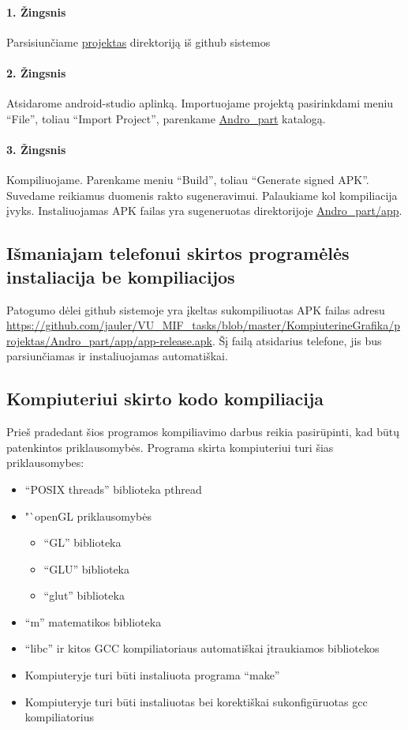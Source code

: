 \documentclass[12pt, a4paper, lithuanian, final]{article}
\begin{document}
\paragraph{1. Žingsnis}
Parsisiunčiame \url{projektas} direktoriją iš github sistemos

\paragraph{2. Žingsnis}
Atsidarome android-studio aplinką.
Importuojame projektą pasirinkdami meniu "`File"', toliau "`Import Project"', parenkame \url{Andro_part} katalogą.

\paragraph{3. Žingsnis}
Kompiliuojame. Parenkame meniu "`Build"', toliau "`Generate signed APK"'.
Suvedame reikiamus duomenis rakto sugeneravimui.
Palaukiame kol kompiliacija įvyks.
Instaliuojamas APK failas yra sugeneruotas direktorijoje \url{Andro_part/app}.

\subsection{Išmaniajam telefonui skirtos programėlės instaliacija be kompiliacijos}
Patogumo dėlei github sistemoje yra įkeltas sukompiliuotas APK failas adresu \url{https://github.com/jauler/VU_MIF_tasks/blob/master/KompiuterineGrafika/projektas/Andro_part/app/app-release.apk}.
Šį failą atsidarius telefone, jis bus parsiunčiamas ir instaliuojamas automatiškai.


\subsection{Kompiuteriui skirto kodo kompiliacija}
Prieš pradedant šios programos kompiliavimo darbus reikia pasirūpinti, kad būtų patenkintos priklausomybės.
Programa skirta kompiuteriui turi šias priklausomybes:
\begin{itemize}
	\item "`POSIX threads"' biblioteka pthread
	\item "`openGL priklausomybės
		\begin{itemize}
			\item "`GL"' biblioteka
			\item "`GLU"' biblioteka
			\item "`glut"' biblioteka
		\end{itemize}

	\item "`m"' matematikos biblioteka
	\item "`libc"' ir kitos GCC kompiliatoriaus automatiškai įtraukiamos bibliotekos
	\item Kompiuteryje turi būti instaliuota programa "`make"'
	\item Kompiuteryje turi būti instaliuotas bei korektiškai sukonfigūruotas gcc kompiliatorius
\end{itemize}
\end{document}
